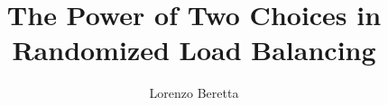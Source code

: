 \documentclass[runningheads]{llncs}
\begin{document}
\title{The Power of Two Choices in Randomized Load Balancing}

\author{Lorenzo Beretta%
}
%
\authorrunning{  }
\titlerunning{  }
%

\maketitle












\clearpage{}


\end{document}
